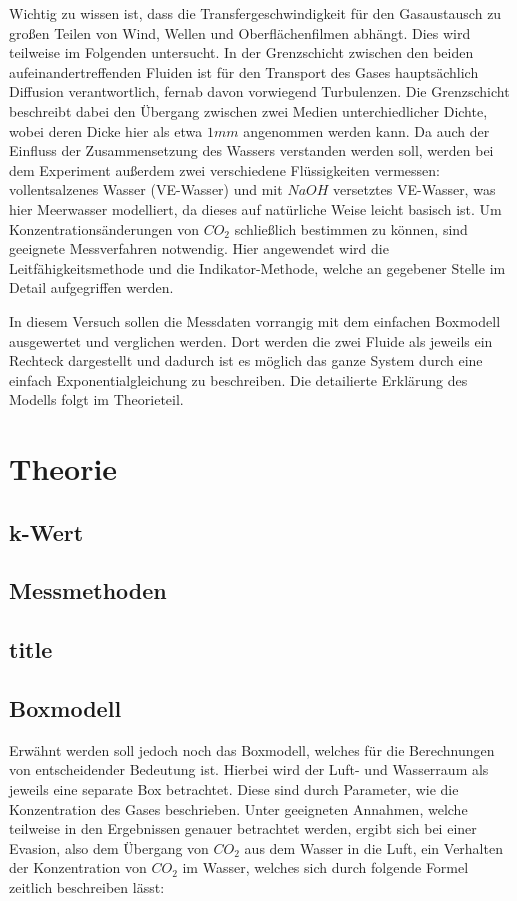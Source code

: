 \documentclass[12pt]{article}
\begin{document}
Wichtig zu wissen ist, dass die Transfergeschwindigkeit für den Gasaustausch zu großen Teilen von Wind, Wellen und Oberflächenfilmen abhängt. Dies wird teilweise im Folgenden untersucht. In der Grenzschicht zwischen den beiden aufeinandertreffenden Fluiden ist für den Transport des Gases hauptsächlich Diffusion verantwortlich, fernab davon vorwiegend Turbulenzen. Die Grenzschicht beschreibt dabei den Übergang zwischen zwei Medien unterchiedlicher Dichte, wobei deren Dicke hier als etwa $1 mm$ angenommen werden kann.
Da auch der Einfluss der Zusammensetzung des Wassers verstanden werden soll, werden bei dem Experiment außerdem zwei verschiedene Flüssigkeiten vermessen: vollentsalzenes Wasser (VE-Wasser) und mit $NaOH$ versetztes VE-Wasser, was hier Meerwasser modelliert, da dieses auf natürliche Weise leicht basisch ist. Um Konzentrationsänderungen von $CO_2$ schließlich bestimmen zu können, sind geeignete Messverfahren notwendig. Hier angewendet wird die Leitfähigkeitsmethode und die Indikator-Methode, welche an gegebener Stelle im Detail aufgegriffen werden.

In diesem Versuch sollen die Messdaten vorrangig mit dem einfachen Boxmodell ausgewertet und verglichen werden. Dort werden die zwei Fluide als jeweils ein Rechteck dargestellt und dadurch ist es möglich das ganze System durch eine einfach Exponentialgleichung zu beschreiben. Die detailierte Erklärung des Modells folgt im Theorieteil.

\section{Theorie}

\subsection*{k-Wert}
\subsection{Messmethoden}
\subsection{title}

\subsection{Boxmodell}
Erwähnt werden soll jedoch noch das Boxmodell, welches für die Berechnungen von entscheidender Bedeutung ist. Hierbei wird der Luft- und Wasserraum als jeweils eine separate Box betrachtet. Diese sind durch Parameter, wie die Konzentration des Gases beschrieben. Unter geeigneten Annahmen, welche teilweise in den Ergebnissen genauer betrachtet werden, ergibt sich bei einer Evasion, also dem Übergang von $CO_2$ aus dem Wasser in die Luft, ein Verhalten der Konzentration von $CO_2$ im Wasser, welches sich durch folgende Formel zeitlich beschreiben lässt:
\end{document}
